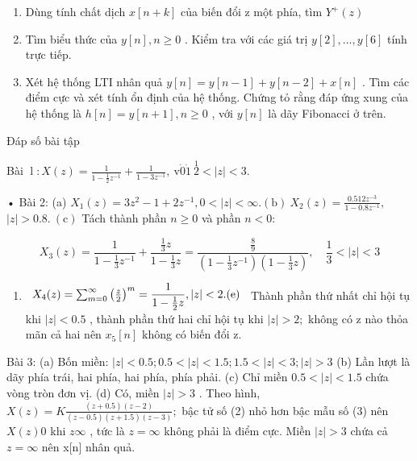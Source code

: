 \documentclass[
  10
]{article}
\providecommand{\tightlist}{%
  \setlength{\itemsep}{0pt}\setlength{\parskip}{0pt}}
\begin{document}
\begin{enumerate}
\def\labelenumi{(\alph{enumi})}
\item
  Dùng tính chất dịch \(x [ n + k ]\) của biến đổi z một phía, tìm
  \(Y ^ { + } ( z )\)
\item
  Tìm biểu thức của \(y [ n ] , n \geq 0\) . Kiểm tra với các giá trị
  \(y [ 2 ] , \ldots , y [ 6 ]\) tính trực tiếp.
\item
  Xét hệ thống LTI nhân quả
  \(y [ n ] = y [ n - 1 ] + y [ n - 2 ] + x [ n ]\) . Tìm các điểm cực
  và xét tính ổn định của hệ thống. Chứng tỏ rằng đáp ứng xung của hệ
  thống là \(h [ n ] = y [ n + 1 ] , n \geq 0\) , với \(y [ n ]\) là dãy
  Fibonacci ở trên.
\end{enumerate}

Đáp số bài tập

Bài
\(\operatorname { l } \colon X ( z ) = { \frac { 1 } { 1 - { \frac { 1 } { 2 } } z ^ { - 1 } } } + { \frac { 1 } { 1 - 3 z ^ { - 1 } } } , { \mathrm { ~ v } } { \dot { 0 } } { \dot { 1 } } \ { \overset { 1 } { 2 } } < | z | < 3 .\)

• Bài 2: (a)
\(X _ { 1 } ( z ) = 3 z ^ { 2 } - 1 + 2 z ^ { - 1 } , 0 < | z | < \infty . \mathrm { ( b ) } \ X _ { 2 } ( z ) = { \frac { 0 . 5 1 2 z ^ { - 3 } } { 1 - 0 . 8 z ^ { - 1 } } } ,\)
\(| z | > 0 . 8 . \ \mathrm { ( c ) }\) Tách thành phần \(n \geq 0\) và
phần \(n < 0 \mathrm { : }\)

\[
X _ {3} (z) = \frac {1}{1 - \frac {1}{3} z ^ {- 1}} + \frac {\frac {1}{3} z}{1 - \frac {1}{3} z} = \frac {\frac {8}{9}}{\left(1 - \frac {1}{3} z ^ {- 1}\right) \left(1 - \frac {1}{3} z\right)}, \quad \frac {1}{3} <   | z | <   3
\]

\begin{enumerate}
\def\labelenumi{(\alph{enumi})}
\setcounter{enumi}{3}
\tightlist
\item
  \(\begin{array} { c c c } { { X _ { 4 } ( z ) = \sum _ { m = 0 } ^ { \infty } \left( \frac { z } { 2 } \right) ^ { m } = \displaystyle \frac { 1 } { 1 - \frac { 1 } { 2 } z } , | z | < 2 . { \mathrm { ( e ) } } } } \end{array}\)
  Thành phần thứ nhất chỉ hội tụ khi \(| z | < 0 . 5\) , thành phần thứ
  hai chỉ hội tụ khi \(| z | > 2 ;\) không có z nào thỏa mãn cả hai nên
  \(x _ { 5 } [ n ]\) không có biến đổi z.
\end{enumerate}

Bài 3: (a) Bốn miền:
\(| z | < 0 . 5 ; 0 . 5 < | z | < 1 . 5 ; 1 . 5 < | z | < 3 ; | z | > 3\)
(b) Lần lượt là dãy phía trái, hai phía, hai phía, phía phải. (c) Chỉ
miền \(0 . 5 < | z | < 1 . 5\) chứa vòng tròn đơn vị. (d) Có, miền
\(| z | > 3\) . Theo hình,
\(X ( z ) = K { \frac { ( z + 0 . 5 ) ( z - 2 ) } { ( z - 0 . 5 ) ( z + 1 . 5 ) ( z - 3 ) } } ;\)
bậc tử số (2) nhỏ hơn bậc mẫu số (3) nên \(X ( z )  0\) khi
\(z  \infty\) , tức là \(z = \infty\) không phải là điểm cực. Miền
\(| z | > 3\) chứa cả \(z = \infty\) nên x{[}n{]} nhân quả.
\end{document}

